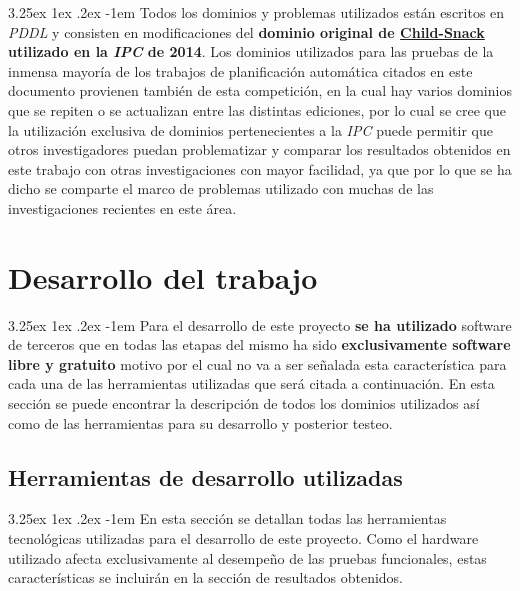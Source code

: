 \documentclass{article}
\makeatletter
\renewcommand\paragraph{\@startsection{paragraph}{5}{\z@}%
      {3.25ex \@plus1ex \@minus.2ex}%
      {-1em}%
      {\normalfont\normalsize\bfseries}}
\makeatother
\begin{document}
    \paragraph{}
    Todos los dominios y problemas utilizados están escritos en \textit{PDDL} y consisten en modificaciones del \textbf{dominio original de \href{https://helios.hud.ac.uk/scommv/IPC-14/repository/benchmarksV1.1.zip}{Child-Snack} utilizado en la \textit{IPC} de 2014\cite{ipc2014}}. Los dominios utilizados para las pruebas de la inmensa mayoría de los trabajos de planificación automática citados en este documento provienen también de esta competición, en la cual hay varios dominios que se repiten o se actualizan entre las distintas ediciones, por lo cual se cree que la utilización exclusiva de dominios pertenecientes a la \textit{IPC} puede permitir que otros investigadores puedan problematizar y comparar los resultados obtenidos en este trabajo con otras investigaciones con mayor facilidad, ya que por lo que se ha dicho se comparte el marco de problemas utilizado con muchas de las investigaciones recientes en este área.
    
    \pagebreak
    
    \section{Desarrollo del trabajo}
    
    \paragraph{}
    Para el desarrollo de este proyecto \textbf{se ha utilizado} software de terceros que en todas las etapas del mismo ha sido \textbf{exclusivamente software libre y gratuito} motivo por el cual no va a ser señalada esta característica para cada una de las herramientas utilizadas que será citada a continuación. En esta sección se puede encontrar la descripción de todos los dominios utilizados así como de las herramientas para su desarrollo y posterior testeo.
    
    \subsection{Herramientas de desarrollo utilizadas}
    \paragraph{}
    En esta sección se detallan todas las herramientas tecnológicas utilizadas para el desarrollo de este proyecto. Como el hardware utilizado afecta exclusivamente al desempeño de las pruebas funcionales, estas características se incluirán en la sección de resultados obtenidos.
    
\end{document}
